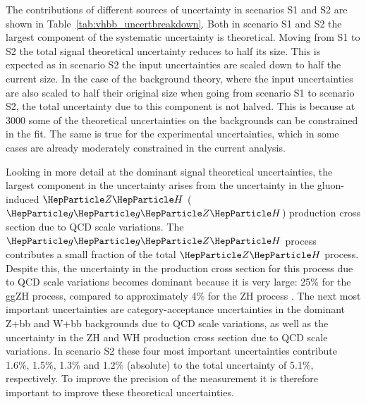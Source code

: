 The contributions of different sources of uncertainty in scenarios S1 and S2 are shown in Table~\ref{tab:vhbb_uncertbreakdown}.
Both in scenario S1 and S2 the largest component of the systematic uncertainty is theoretical. Moving from S1 to S2 the total signal theoretical uncertainty reduces to half its size. This is expected as in scenario S2 the input uncertainties
are scaled down to half the current size. In the case of the background theory, where the input uncertainties are also scaled to half their original
size when going from scenario S1 to scenario S2, the total uncertainty due to this component is not halved. This is because at 3000 \fbinv
some of the theoretical uncertainties on the backgrounds can be constrained in the fit. The same is true for the experimental uncertainties, which
in some cases are already moderately constrained in the current analysis.

Looking in more detail at the dominant signal theoretical uncertainties, the largest component in the uncertainty arises from the uncertainty in the gluon-induced $\zh$ ($\ggZH$) production cross section due to QCD scale variations.
The $\ggZH$ process contributes a small fraction of the total $\zh$ process. Despite this, the uncertainty in the production cross section for this process due to QCD scale variations 
becomes dominant because it is very large: 25\% for the ggZH process, compared to approximately 4\% for the ZH process \cite{deFlorian:2016spz}.
The next most important uncertainties are category-acceptance uncertainties in the dominant Z+bb and W+bb backgrounds due to QCD scale variations, as well as the uncertainty in the ZH and WH production
cross section due to QCD scale variations. In scenario S2 these four most important uncertainties contribute 1.6\%, 1.5\%, 1.3\% and 1.2\% (absolute) to
the total uncertainty of 5.1\%, respectively. To improve the precision of the measurement it is therefore important to improve these theoretical uncertainties.

